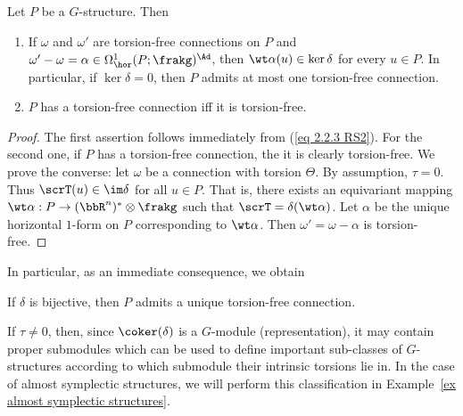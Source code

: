 \begin{prop}[{{\cite[Prop.~2.2.6]{RS2}}}]\label{prop 2.2.6 RS2}
    Let $P$ be a $G$-structure. Then
    \begin{enumerate}
        \item If $\omega$ and $\omega'$ are torsion-free connections on $P$ and $\omega'-\omega=\alpha\in\Omega^1_{\hor}(P;\frakg)^\Ad$, then $\wt\alpha(u)\in\ker\delta$ for every $u\in P$. In particular, if $\ker\delta=0$, then $P$ admits at most one torsion-free connection.
        \item $P$ has a torsion-free connection iff it is torsion-free.
    \end{enumerate}
\end{prop}
\begin{proof}
    The first assertion follows immediately from (\ref{eq 2.2.3 RS2}). For the second one, if $P$ has a torsion-free connection, the it is clearly torsion-free. We prove the converse: let $\omega$ be a connection with torsion $\Theta$. By assumption, $\tau=0$. Thus $\scrT(u)\in\im\delta$ for all $u\in P$. That is, there exists an equivariant mapping $\wt\alpha:P\to (\bbR^n)^\ast\otimes\frakg$ such that $\scrT=\delta(\wt\alpha)$. Let $\alpha$ be the unique horizontal $1$-form on $P$ corresponding to $\wt\alpha$. Then $\omega'=\omega-\alpha$ is torsion-free.
\end{proof}

In particular, as an immediate consequence, we obtain 
\begin{cor}[{{\cite[Cor.~2.2.7]{RS2}}}]\label{cor 2.2.7 RS2}
    If $\delta$ is bijective, then $P$ admits a unique torsion-free connection.
\end{cor}

\begin{rem}
    If $\tau\neq 0$, then, since $\coker(\delta)$ is a $G$-module (representation), it may contain proper submodules which can be used to define important sub-classes of $G$-structures according to which submodule their intrinsic torsions lie in. In the case of almost symplectic structures, we will perform this classification in Example~\ref{ex almost symplectic structures}.
\end{rem}

